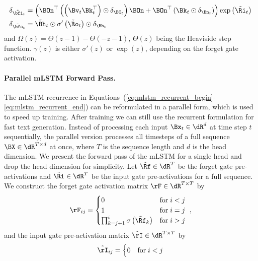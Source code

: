 \documentclass[dvipsnames]{article}
\begin{document}
\begin{appendix}
\begin{align}
        \delta_{\tilde{\bfi}_t} &= \left( \BOn^\top \left( \left( \Bv_t \Bk^\top_t \right) \odot \delta_{\BC_{t}} \right) \BOn + \BOn^\top \left( \Bk_{t} \odot \delta_{\Bn_{t}} \right) \right) \exp \left( \tilde{\Ri}_t \right) \\
        \delta_{\tilde{\bfo}_t} &= \tilde{\Bh}_t \odot \sigma' \left( \tilde{\Ro}_t \right) \odot \delta_{\Bh_t}
	\end{align}
	and $\Omega \left( z \right) = \Theta \left( z - 1 \right) - \Theta \left( - z - 1 \right)$, $\Theta \left( z \right)$ being the Heaviside step function. $\gamma \left( z \right)$ is either $\sigma' \left( z \right)$ or $\exp \left( z \right) $, depending on the forget gate activation.
\paragraph{Parallel mLSTM Forward Pass.}
\label{sec:appmLSTMparallel}
The mLSTM recurrence in Equations~(\ref{eq:mlstm_recurrent_begin}-\ref{eq:mlstm_recurrent_end}) can be reformulated in a parallel form, which is used to speed up training.
After training we can still use the recurrent formulation for fast text generation.
Instead of processing each input $\Bx_t \in \dR^d$ at time step $t$ sequentially,
the parallel version processes all timesteps of a full sequence $\BX \in \dR^{T \times d}$ at once, where $T$ is the sequence length and $d$ is the head dimension.
We present the forward pass of the mLSTM for a single head and drop the head dimension for simplicity.
Let $\tilde{\bm{\Rf}} \in \dR^T$ be the forget gate pre-activations and $\tilde{\bm{\Ri}} \in \dR^T$ be the input gate pre-activations for a full sequence.
We construct the forget gate activation matrix $\bm{\rF} \in \dR^{T \times T}$ by
\begin{equation}
    \bm{\rF}_{ij} = \begin{cases}
        0                                                  & \text{for} \; i < j \\
        1                                                  & \text{for} \; i = j \\
        \prod_{k=j+1}^{i} \sigma\left(\tilde{\Rf}_k\right) & \text{for} \; i > j
    \end{cases} \ ,
\end{equation}
and the input gate pre-activation matrix $\tilde{\bm{\rI}} \in \dR^{T \times T}$ by
\begin{equation}
    \tilde{\bm{\rI}}_{ij} = \begin{cases}
        0     & \text{for} \; i < j \\

\end{cases}
\end{equation}
\end{appendix}
\end{document}
